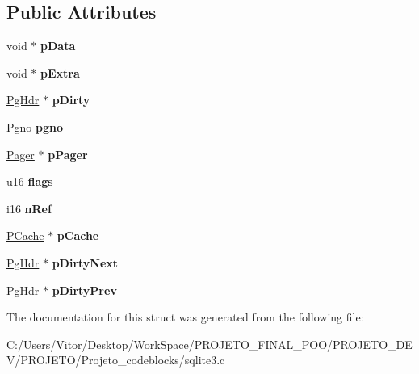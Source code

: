\subsection*{Public Attributes}
\begin{DoxyCompactItemize}
\item 
\hypertarget{struct_pg_hdr_a0f9f2ac8492c0cdad5898036db20b798}{void $\ast$ {\bfseries p\-Data}}\label{struct_pg_hdr_a0f9f2ac8492c0cdad5898036db20b798}

\item 
\hypertarget{struct_pg_hdr_a8ff7430ed04077f1ae20d10801968164}{void $\ast$ {\bfseries p\-Extra}}\label{struct_pg_hdr_a8ff7430ed04077f1ae20d10801968164}

\item 
\hypertarget{struct_pg_hdr_a7732b1c0f19d9555ac93d4879fc95bbd}{\hyperlink{struct_pg_hdr}{Pg\-Hdr} $\ast$ {\bfseries p\-Dirty}}\label{struct_pg_hdr_a7732b1c0f19d9555ac93d4879fc95bbd}

\item 
\hypertarget{struct_pg_hdr_ab6e2223e410acf9bae7f12f1b1293589}{Pgno {\bfseries pgno}}\label{struct_pg_hdr_ab6e2223e410acf9bae7f12f1b1293589}

\item 
\hypertarget{struct_pg_hdr_aaa4879a9510c8a819a1e10a8ee21495b}{\hyperlink{struct_pager}{Pager} $\ast$ {\bfseries p\-Pager}}\label{struct_pg_hdr_aaa4879a9510c8a819a1e10a8ee21495b}

\item 
\hypertarget{struct_pg_hdr_a8ef58380f7e04f1e3c76fa208e227f95}{u16 {\bfseries flags}}\label{struct_pg_hdr_a8ef58380f7e04f1e3c76fa208e227f95}

\item 
\hypertarget{struct_pg_hdr_ac68c685d117788c18849e8853dd419d5}{i16 {\bfseries n\-Ref}}\label{struct_pg_hdr_ac68c685d117788c18849e8853dd419d5}

\item 
\hypertarget{struct_pg_hdr_a557aeaddd1b0805815ce06f1bfd27782}{\hyperlink{struct_p_cache}{P\-Cache} $\ast$ {\bfseries p\-Cache}}\label{struct_pg_hdr_a557aeaddd1b0805815ce06f1bfd27782}

\item 
\hypertarget{struct_pg_hdr_a61b56eb694ce445799963f7eb912e367}{\hyperlink{struct_pg_hdr}{Pg\-Hdr} $\ast$ {\bfseries p\-Dirty\-Next}}\label{struct_pg_hdr_a61b56eb694ce445799963f7eb912e367}

\item 
\hypertarget{struct_pg_hdr_a8392b45bb05d88c734020beb912304dc}{\hyperlink{struct_pg_hdr}{Pg\-Hdr} $\ast$ {\bfseries p\-Dirty\-Prev}}\label{struct_pg_hdr_a8392b45bb05d88c734020beb912304dc}

\end{DoxyCompactItemize}


The documentation for this struct was generated from the following file\-:\begin{DoxyCompactItemize}
\item 
C\-:/\-Users/\-Vitor/\-Desktop/\-Work\-Space/\-P\-R\-O\-J\-E\-T\-O\-\_\-\-F\-I\-N\-A\-L\-\_\-\-P\-O\-O/\-P\-R\-O\-J\-E\-T\-O\-\_\-\-D\-E\-V/\-P\-R\-O\-J\-E\-T\-O/\-Projeto\-\_\-codeblocks/sqlite3.\-c\end{DoxyCompactItemize}
